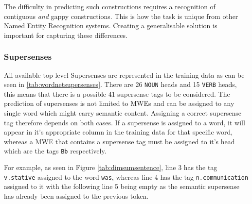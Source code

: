The difficulty in predicting such constructions requires a recognition of contiguous {\it and} gappy constructions. This is how the \dimsum task is unique from other Named Entity Recognition systems. Creating a generalisable solution is important for capturing these differences. 

\subsubsection{Supersenses}

All available top level Supersenses are represented in the training data as can be seen in \ref{tab:wordnetsupersenses}. There are 26 \texttt{NOUN} heads and 15 \texttt{VERB} heads, this means that there is a possible 41 supersense tags to be considered. The prediction of supersenses is not limited to MWEs and can be assigned to any single word which might carry semantic content. Assigning a correct supersense tag therefore depends on both cases. If a supersense is assigned to a word, it will appear in it's appropriate column in the training data for that specific word, whereas a MWE that contains a supersense tag must be assigned to it's head which are the tags \texttt{Bb} respectively. 

For example, as seen in Figure \ref{tab:dimsumsentence}, line 3 has the tag \texttt{v.stative} assigned to the word \texttt{was}, whereas line 4 has the tag \texttt{n.communication} assigned to it with the following line 5 being empty as the semantic supersense has already been assigned to the previous token. 

